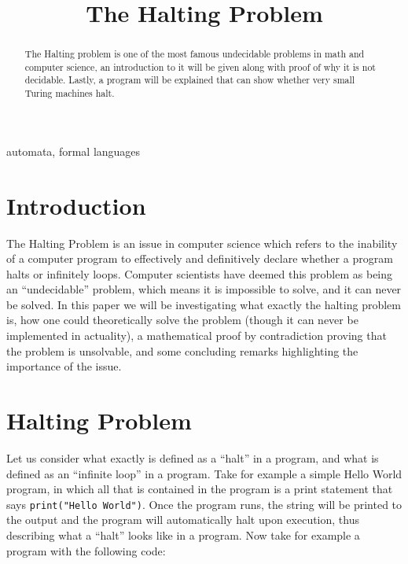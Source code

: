 \documentclass[journal,12pt,onecolumn,draftclsnofoot,]{IEEEtran}
\begin{document}
\title{The Halting Problem}

\author{

}

\maketitle

\begin{abstract}
  The Halting problem is one of the most famous undecidable problems in math and computer 
  science, an introduction to it will be given along with proof of why it is not decidable.
  Lastly, a program will be explained that can show whether very small Turing machines halt.
\end{abstract}

\begin{IEEEkeywords}
automata, formal languages
\end{IEEEkeywords}

\section{Introduction}

The Halting Problem is an issue in computer science which refers to the inability of a computer program to effectively and definitively declare whether a program halts or infinitely loops. Computer scientists have deemed this problem as being an “undecidable” problem, which means it is impossible to solve, and it can never be solved. In this paper we will be investigating what exactly the halting problem is, how one could theoretically solve the problem (though it can never be implemented in actuality), a mathematical proof by contradiction proving that the problem is unsolvable, and some concluding remarks highlighting the importance of the issue. 

\section{Halting Problem}

Let us consider what exactly is defined as a “halt” in a program, and what is defined as an “infinite loop” in a program. Take for example a simple Hello World program, in which all that is contained in the program is a print statement that says \verb|print("Hello World")|. Once the program runs, the string will be printed to the output and the program will automatically halt upon execution, thus describing what a “halt” looks like in a program. Now take for example a program with the following code: 
\end{document}

